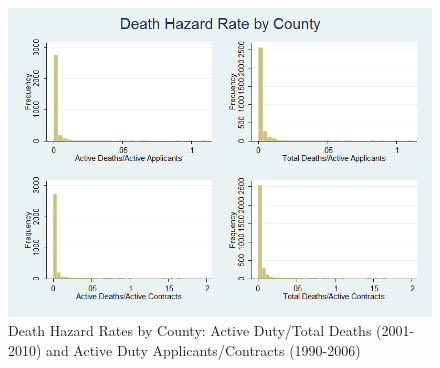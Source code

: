 \documentclass[12pt] {article}
\begin{document}
\begin{figure}
\includegraphics[scale=0.6]{../Output/hist_county_combined.png}
\caption{Death Hazard Rates by County: Active Duty/Total Deaths (2001-2010) and Active Duty Applicants/Contracts (1990-2006)}
\label{Flo:HISTOcountydeaths}
\end{figure}
\end{document}
